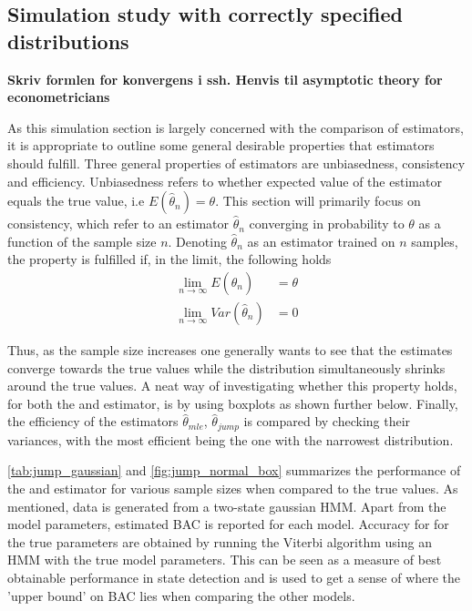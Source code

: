 \subsection{Simulation study with correctly specified distributions}
\label{section:simulation_corspeciffied}
\textbf{Skriv formlen for konvergens i ssh. Henvis til asymptotic theory for econometricians}

As this simulation section is largely concerned with the comparison of estimators, it is appropriate to outline some general desirable properties that estimators should fulfill. Three general properties of estimators are unbiasedness, consistency and efficiency. Unbiasedness refers to whether expected value of the estimator equals the true value, i.e $E(\hat\theta_n)=\theta$. This section will primarily focus on consistency, which refer to an estimator $\hat\theta_n$ converging in probability to $\theta$ as a function of the sample size $n$. Denoting $\hat\theta_n$ as an estimator trained on $n$ samples, the property is fulfilled if, in the limit, the following holds
\begin{align}
    \lim_{n\to\infty} E(\hat\theta_n) &= \theta \\
    \lim_{n\to\infty} Var(\hat\theta_n) &= 0
\label{eq:sim_consistency}
\end{align}

Thus, as the sample size increases one generally wants to see that the estimates converge towards the true values while the distribution simultaneously shrinks around the true values. A neat way of investigating whether this property holds, for both the \mle and \jump estimator, is by using boxplots as shown further below. Finally, the efficiency of the estimators $\hat\theta_{mle}$, $\hat\theta_{jump}$ is compared by checking their variances, with the most efficient being the one with the narrowest distribution.

\cref{tab:jump_gaussian} and \cref{fig:jump_normal_box} summarizes the performance of the \mle and \jump estimator for various sample sizes when compared to the true values. As mentioned, data is generated from a two-state gaussian HMM. Apart from the model parameters, estimated BAC is reported for each model. Accuracy for for the true parameters are obtained by running the Viterbi algorithm using an HMM with the true model parameters. This can be seen as a measure of best obtainable performance in state detection and is used to get a sense of where the 'upper bound' on BAC lies when comparing the other models.


